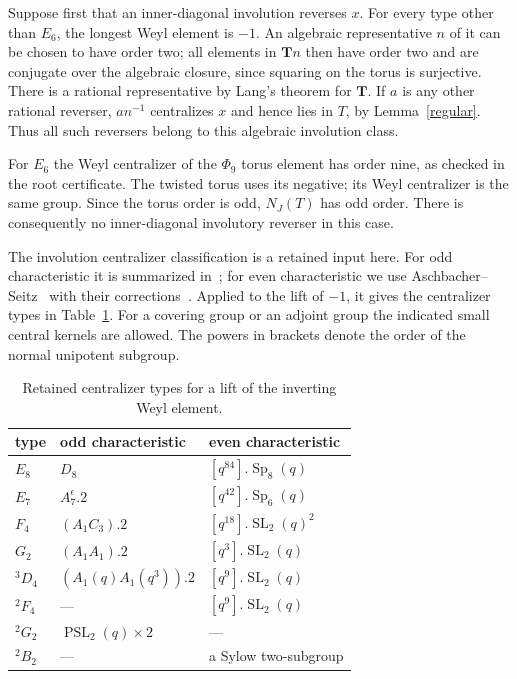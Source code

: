 \documentclass[10pt,a4paper]{article}
\newcommand{\Sp}{\operatorname{Sp}}\newcommand{\SL}{\operatorname{SL}}
\newcommand{\PSL}{\operatorname{PSL}}\newcommand{\PGL}{\operatorname{PGL}}
\begin{document}
Suppose first that an inner-diagonal involution reverses $x$.
For every type other than $E_6$, the longest Weyl element is $-1$.
An algebraic representative $n$ of it can be chosen to have order two;
all elements in $\mathbf Tn$ then have order two and are conjugate
over the algebraic closure, since squaring on the torus is surjective.
There is a rational representative by Lang's theorem for $\mathbf T$.
If $a$ is any other rational reverser, $an^{-1}$ centralizes $x$ and hence
lies in $T$, by Lemma~\ref{regular}. Thus all such reversers belong to
this algebraic involution class.

For $E_6$ the Weyl centralizer of the $\Phi_9$ torus element has order
nine, as checked in the root certificate. The twisted torus uses its
negative; its Weyl centralizer is the same group. Since the torus order
is odd, $N_J(T)$ has odd order. There is consequently no inner-diagonal
involutory reverser in this case.

The involution centralizer classification is a retained input here.
For odd characteristic it is summarized in~\cite[Section~2, Table~5]{BT};
for even characteristic we use Aschbacher--Seitz~\cite[Sections~13--18]{AS}
with their corrections~\cite{ASerr}. Applied to the lift of $-1$, it gives
the centralizer types in Table~\ref{centralizers}. For a covering group
or an adjoint group the indicated small central kernels are allowed.
The powers in brackets denote the order of the normal unipotent subgroup.

\begin{table}[ht]\centering\small
\begin{tabular}{lll}
\toprule
type&odd characteristic&even characteristic\\\midrule
$E_8$&$D_8$&$[q^{84}].\Sp_8(q)$\\
$E_7$&$A_7^\epsilon.2$&$[q^{42}].\Sp_6(q)$\\
$F_4$&$(A_1C_3).2$&$[q^{18}].\SL_2(q)^2$\\
$G_2$&$(A_1A_1).2$&$[q^3].\SL_2(q)$\\
$ {}^3D_4$&$(A_1(q)A_1(q^3)).2$&$[q^9].\SL_2(q)$\\
$ {}^2F_4$&---&$[q^9].\SL_2(q)$\\
$ {}^2G_2$&$\PSL_2(q)\times2$&---\\
$ {}^2B_2$&---&a Sylow two-subgroup\\\bottomrule
\end{tabular}
\caption{Retained centralizer types for a lift of the inverting Weyl element.}
\label{centralizers}
\end{table}
\end{document}
